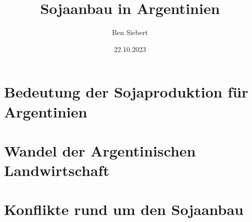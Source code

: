 \documentclass[11pt]{article}
\begin{document}
    \selectfont

    \renewcommand{\baselinestretch}{1.50}\normalsize

    \title{Sojaanbau in Argentinien}
    \author{Ben Siebert}
    \date{22.10.2023}
    \maketitle

    \section{Bedeutung der Sojaproduktion für Argentinien}

    

    \section{Wandel der Argentinischen Landwirtschaft}

    

    \section{Konflikte rund um den Sojaanbau}

    
\end{document}

